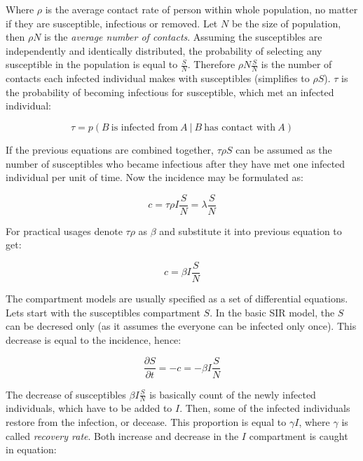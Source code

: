 \documentclass[
  digital, %
  oneside, %
  lof,     %
  lot,     %
]{fithesis4}
\begin{document}
Where $\rho$ is the average contact rate of person within whole 
population, no matter if they are susceptible, infectious 
or removed.
Let $N$ be the size of population,
then $\rho N$ is the \textit{average number of contacts}.
Assuming the susceptibles are independently and identically 
distributed, the probability of selecting any susceptible 
in the population is equal to $\frac{S}{N}$.
Therefore $\rho N\frac{S}{N}$ is the number of contacts 
each infected individual makes with susceptibles 
(simplifies to $\rho S$).
$\tau$ is the probability of becoming infectious for 
susceptible, which met an infected individual:

\begin{equation}
	\tau = p \left( B~\textrm{is infected from}~A~|~B~\textrm{has contact with}~A \right)
\end{equation}

If the previous equations are combined together, 
$\tau \rho S$ can be assumed as the number of 
susceptibles who became infectious after they have 
met one infected individual per unit of time.
Now the incidence may be formulated as:

\begin{equation}
	c = \tau \rho I \frac{S}{N} = \lambda \frac{S}{N}
\end{equation}

For practical usages denote $\tau \rho$ as $\beta$ 
and substitute it into previous equation to get:

\begin{equation}
	c = \beta I \frac{S}{N}
\end{equation}

The compartment models are usually specified as a set of
differential equations. Lets start with the susceptibles
compartment $S$. In the basic SIR model, the $S$
can be decresed only (as it assumes the everyone can be 
infected only once).
This decrease is equal to the incidence, hence:

\begin{equation}
	\frac{\partial{S}}{\partial{t}} = -c = -\beta I \frac{S}{N}
\end{equation}

The decrease of susceptibles $\beta I \frac{S}{N}$ is basically 
count of the newly infected individuals, which have 
to be added to $I$. 
Then, some of the infected individuals restore from 
the infection, or decease. 
This proportion is equal to $\gamma I$, where $\gamma$ 
is called \textit{recovery rate}. Both increase and decrease in 
the $I$ compartment is caught in equation:
\end{document}
